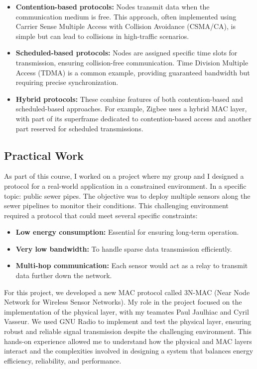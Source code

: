 \begin{itemize}
    \item \textbf{Contention-based protocols:} Nodes transmit data when the communication medium is free. This approach, often implemented using Carrier Sense Multiple Access with Collision Avoidance (CSMA/CA), is simple but can lead to collisions in high-traffic scenarios.
    \item \textbf{Scheduled-based protocols:} Nodes are assigned specific time slots for transmission, ensuring collision-free communication. Time Division Multiple Access (TDMA) is a common example, providing guaranteed bandwidth but requiring precise synchronization.
    \item \textbf{Hybrid protocols:} These combine features of both contention-based and scheduled-based approaches. For example, Zigbee uses a hybrid MAC layer, with part of its superframe dedicated to contention-based access and another part reserved for scheduled transmissions.
\end{itemize}

\subsection{Practical Work}
\indent \indent As part of this course, I worked on a project where my group and I designed a protocol for a real-world application in a constrained environment. In a specific topic: public sewer pipes. The objective was to deploy multiple sensors along the sewer pipelines to monitor their conditions. This challenging environment required a protocol that could meet several specific constraints:

\begin{itemize}
    \item \textbf{Low energy consumption:} Essential for ensuring long-term operation.
    \item \textbf{Very low bandwidth:} To handle sparse data transmission efficiently.
    \item \textbf{Multi-hop communication:} Each sensor would act as a relay to transmit data further down the network.
\end{itemize}

For this project, we developed a new MAC protocol called 3N-MAC (Near Node Network for Wireless Sensor Networks). My role in the project focused on the implementation of the physical layer, with my teamates Paul Jaulhiac and Cyril Vasseur. We used GNU Radio to implement and test the physical layer, ensuring robust and reliable signal transmission despite the challenging environment. This hands-on experience allowed me to understand how the physical and MAC layers interact and the complexities involved in designing a system that balances energy efficiency, reliability, and performance.

